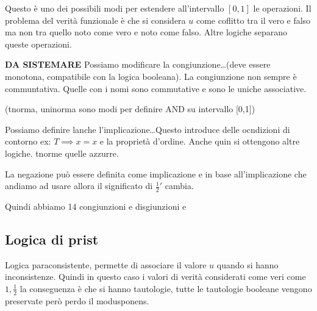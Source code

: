 Questo è uno dei possibili modi per estendere all'intervallo $[0,1]$ le operazioni.
Il problema del verità funzionale è che si considera $u$ come coflitto tra il vero 
e falso ma non tra quello noto come vero e noto come falso. Altre logiche separano 
queste operazioni.  

\textbf{DA SISTEMARE}
Possiamo modificare la congiunzione\dots (deve essere monotona, compatibile con la logica booleana).
La congiunzione non sempre è communtativa. Quelle con i nomi sono commutative e sono 
le uniche associative.

(tnorma, uninorma sono modi per definire AND su intervallo [0,1])

Possiamo definire lanche l'implicazione\dots Questo introduce delle ocndizioni di contorno
ex: $T\implies x= x$ e la proprietà d'ordine. Anche quin si ottengono altre logiche.
tnorme quelle azzurre.

La negazione può essere definita come implicazione e in base all'implicazione 
che andiamo ad usare allora il significato di $\frac{1}{2}'$ cambia.

Quindi abbiamo 14 congiunzioni e disgiunzioni e 


\subsection{Logica di prist}
Logica paraconsistente, permette di associare il valore $u$ quando si hanno inconsistenze.
Quindi in questo caso i valori di verità considerati come veri come $1,\frac{1}{2}$
la conseguenza è che si hanno tautologie, tutte le tautologie booleane vengono preservate 
però perdo il modusponens.
